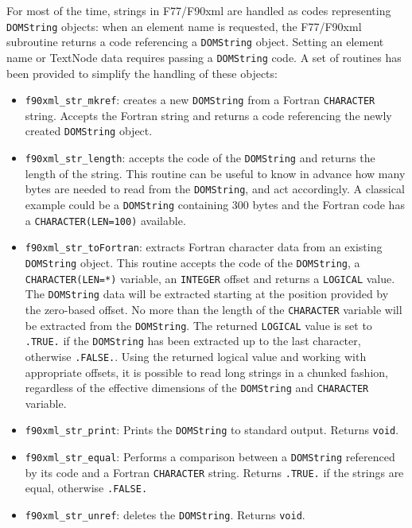 For most of the time, strings in F77/F90xml are handled as codes
representing \texttt{DOMString} objects: when an element name is requested,
the F77/F90xml subroutine returns a code referencing a \texttt{DOMString}
object. Setting an element name or TextNode data requires passing a
\texttt{DOMString} code. A set of routines has been provided to simplify the
handling of these objects:
\begin{itemize}
\item \texttt{f90xml\_str\_mkref}: creates a new \texttt{DOMString} from a Fortran
\texttt{CHARACTER} string. Accepts the Fortran string and returns a code referencing
the newly created \texttt{DOMString} object.
\item \texttt{f90xml\_str\_length}: accepts the code of the \texttt{DOMString} and
returns the length of the string.  This routine can be useful to know in
advance how many bytes are needed to read from the \texttt{DOMString}, and act
accordingly. A classical example could be a \texttt{DOMString} containing 300 bytes
and the Fortran code has a \texttt{CHARACTER(LEN=100)} available.
\item \texttt{f90xml\_str\_toFortran}: extracts Fortran character
data from an existing \texttt{DOMString} object. This routine accepts the code of the
\texttt{DOMString}, a \texttt{CHARACTER(LEN=*)} variable, an \texttt{INTEGER} offset
and returns a \texttt{LOGICAL} value. The \texttt{DOMString} data will be extracted
starting at the position provided by the zero-based offset. No more than
the length of the \texttt{CHARACTER} variable will be extracted from the
\texttt{DOMString}. The returned \texttt{LOGICAL} value is set to \texttt{.TRUE.} if the
\texttt{DOMString} has been extracted up to the last character, otherwise
\texttt{.FALSE.}. Using the returned logical value and working with
appropriate offsets, it is possible to read long strings in a chunked
fashion, regardless of the effective dimensions of the \texttt{DOMString} and
\texttt{CHARACTER} variable.
\item \texttt{f90xml\_str\_print}: Prints the \texttt{DOMString} to standard
output. Returns \texttt{void}. 
\item \texttt{f90xml\_str\_equal}: Performs a comparison between
a \texttt{DOMString} referenced by its code and a Fortran \texttt{CHARACTER} string.
Returns \texttt{.TRUE.} if the strings are equal, otherwise \texttt{.FALSE.}
\item \texttt{f90xml\_str\_unref}: deletes the \texttt{DOMString}. Returns
\texttt{void}.
\end{itemize}

